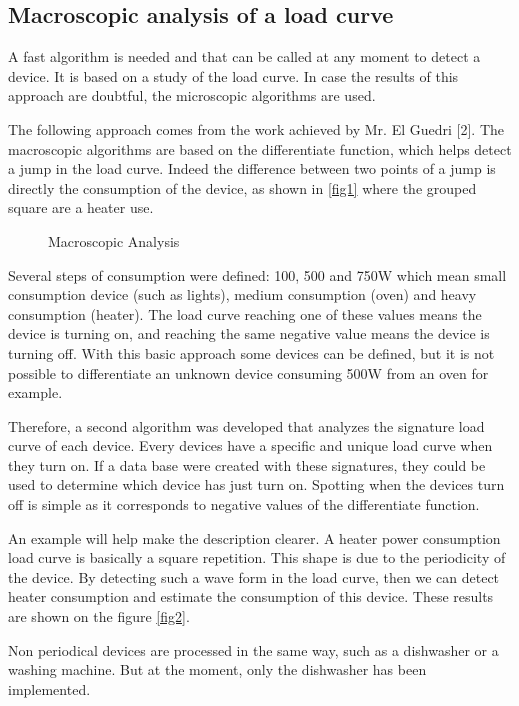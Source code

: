 \subsection{Macroscopic analysis of a load curve}
A fast algorithm is needed and that can be called at any moment to detect a device. It is based on a study of the load curve. In case the results of this approach are doubtful, the microscopic algorithms are used.

The following approach comes from the work achieved by Mr. El Guedri [2]. The macroscopic algorithms are based on the differentiate function, which helps detect a jump in the load curve. Indeed the difference between two points of a jump is directly the consumption of the device, as shown in \ref{fig1} where the grouped square are a heater use.


\begin{figure}[h]
 \begin{center}
   \caption{Macroscopic Analysis}
   \label{fig-1-1-2}
 \end{center}
\end{figure}

Several steps of consumption were defined: 100, 500 and 750W which mean small consumption device (such as lights), medium consumption (oven) and heavy consumption (heater). The load curve reaching one of these values means the device is turning on, and reaching the same negative value means the device is turning off. With this basic approach some devices can be defined, but it is not possible to differentiate an unknown device consuming 500W from an oven for example.

Therefore, a second algorithm was developed that analyzes the signature load curve of each device. Every devices have a specific and unique load curve when they turn on. If a data base were created with these signatures, they could be used to determine which device has just turn on. Spotting when the devices turn off is simple as it corresponds to negative values of the differentiate function.

An example will help make the description clearer. A heater power consumption load curve is basically a square repetition. This shape is due to the periodicity of the device. By detecting such a wave form in the load curve, then we can detect heater consumption and estimate the consumption of this device. These results are shown on the figure \ref{fig2}.


Non periodical devices are processed in the same way, such as a dishwasher or a washing machine. But at the moment, only the dishwasher has been implemented.



